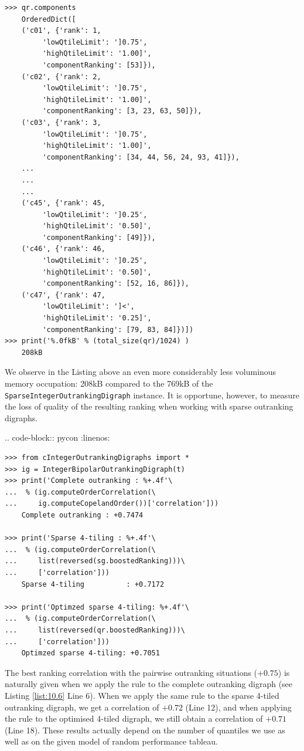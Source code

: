 \begin{lstlisting}
>>> qr.components
    OrderedDict([
    ('c01', {'rank': 1,
	     'lowQtileLimit': ']0.75',
	     'highQtileLimit': '1.00]',
	     'componentRanking': [53]}),
    ('c02', {'rank': 2,
	     'lowQtileLimit': ']0.75',
	     'highQtileLimit': '1.00]',
	     'componentRanking': [3, 23, 63, 50]}),
    ('c03', {'rank': 3,
	     'lowQtileLimit': ']0.75',
	     'highQtileLimit': '1.00]',
	     'componentRanking': [34, 44, 56, 24, 93, 41]}), 
    ...
    ...
    ...
    ('c45', {'rank': 45,
	     'lowQtileLimit': ']0.25',
	     'highQtileLimit': '0.50]',
	     'componentRanking': [49]}),
    ('c46', {'rank': 46,
	     'lowQtileLimit': ']0.25',
	     'highQtileLimit': '0.50]',
	     'componentRanking': [52, 16, 86]}),
    ('c47', {'rank': 47,
	     'lowQtileLimit': ']<',
	     'highQtileLimit': '0.25]',
	     'componentRanking': [79, 83, 84]})])
>>> print('%.0fkB' % (total_size(qr)/1024) )
    208kB
\end{lstlisting}

We observe in the Listing above an even more considerably less voluminous memory occupation: 208kB compared to the 769kB of the \texttt{SparseIntegerOutrankingDigraph} instance. It is opportune, however, to measure the loss of quality of the resulting \Copeland ranking when working with sparse outranking digraphs.

.. code-block:: pycon
   :linenos:
\begin{lstlisting}[caption={Measuring the loss of quality with respect to the standard outranking digraph},label=list:11.6]
>>> from cIntegerOutrankingDigraphs import *
>>> ig = IntegerBipolarOutrankingDigraph(t)
>>> print('Complete outranking : %+.4f'\
...  % (ig.computeOrderCorrelation(\
...     ig.computeCopelandOrder())['correlation']))
    Complete outranking : +0.7474

>>> print('Sparse 4-tiling : %+.4f'\
...  % (ig.computeOrderCorrelation(\
...     list(reversed(sg.boostedRanking)))\
...     ['correlation']))   
    Sparse 4-tiling          : +0.7172

>>> print('Optimzed sparse 4-tiling: %+.4f'\
...  % (ig.computeOrderCorrelation(\
...     list(reversed(qr.boostedRanking)))\
...     ['correlation']))  
    Optimzed sparse 4-tiling: +0.7051
\end{lstlisting}

The best ranking correlation with the pairwise outranking situations ($+0.75$) is naturally given when we apply the \Copeland rule to the complete outranking digraph (see Listing \ref{list:10.6} Line 6). When we apply the same rule to the sparse 4-tiled outranking digraph, we get a correlation of $+0.72$ (Line 12), and when applying the \Copeland rule to the optimised 4-tiled digraph, we still obtain a correlation of $+0.71$ (Line 18). These results actually depend on the number of quantiles we use as well as on the given model of random performance tableau.

